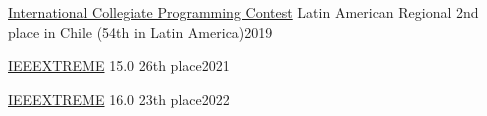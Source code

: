 \documentclass[../main.tex]{subfiles}
\begin{document}
\href{https://icpc.global/}{International Collegiate Programming Contest} Latin American Regional 2nd place in Chile (54th in Latin America)\hfill 2019\par
\href{https://ieeextreme.org/}{IEEEXTREME} 15.0 26th place\hfill 2021\par
\href{https://ieeextreme.org/}{IEEEXTREME} 16.0 23th place\hfill 2022\par
\end{document}
